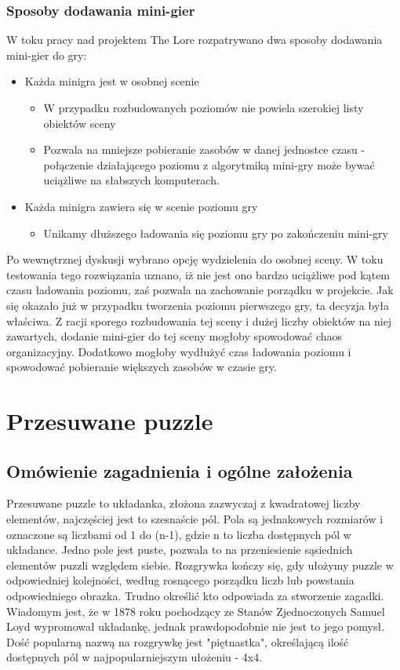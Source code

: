 \documentclass[oneside,polski,logo]{amuthesis}
\begin{document}
\subsubsection{Sposoby dodawania mini-gier}
W toku pracy nad projektem The Lore rozpatrywano dwa sposoby dodawania mini-gier do gry:
\begin{itemize}
	\item{Każda minigra jest w osobnej scenie}
	\begin{itemize}
		\item W przypadku rozbudowanych poziomów nie powiela szerokiej listy obiektów sceny
		\item Pozwala na mniejsze pobieranie zasobów w danej jednostce czasu - połączenie działającego poziomu z algorytmiką mini-gry może bywać uciążliwe na słabszych komputerach.
	\end{itemize}
	\item{Każda minigra zawiera się w scenie poziomu gry}
		\begin{itemize}
		\item Unikamy dłuższego ładowania się poziomu gry po zakończeniu mini-gry
	\end{itemize}
\end{itemize}
Po wewnętrznej dyskusji wybrano opcję wydzielenia do osobnej sceny. W toku testowania tego rozwiązania uznano, iż nie jest ono bardzo uciążliwe pod kątem czasu ładowania poziomu, zaś pozwala na zachowanie porządku w projekcie. Jak się okazało już w przypadku tworzenia poziomu pierwszego gry, ta decyzja była właściwa. Z racji sporego rozbudowania tej sceny i dużej liczby obiektów na niej zawartych, dodanie mini-gier do tej sceny mogłoby spowodować chaos organizacyjny. Dodatkowo mogłoby wydłużyć czas ładowania poziomu i spowodować pobieranie większych zasobów w czasie gry.

\section{Przesuwane puzzle}
\subsection{Omówienie zagadnienia i ogólne założenia}
Przesuwane puzzle to układanka, złożona zazwyczaj z kwadratowej liczby elementów, najczęściej jest to szesnaście pól. Pola są jednakowych rozmiarów i oznaczone są liczbami od 1 do (n-1), gdzie n to liczba dostępnych pól w układance. Jedno pole jest puste, pozwala to na przeniesienie sąsiednich elementów puzzli względem siebie. Rozgrywka kończy się, gdy ułożymy puzzle w odpowiedniej kolejności, według rosnącego porządku liczb lub powstania odpowiedniego obrazka. Trudno określić kto odpowiada za stworzenie zagadki. Wiadomym jest, że w 1878 roku pochodzący ze Stanów Zjednoczonych Samuel Loyd wypromował układankę, jednak prawdopodobnie nie jest to jego pomysł. Dość popularną nazwą na rozgrywkę jest "piętnastka", określającą ilość dostępnych pól w najpopularniejszym ułożeniu - 4x4.  \cite{przesuwane_puzzle}
\end{document}
